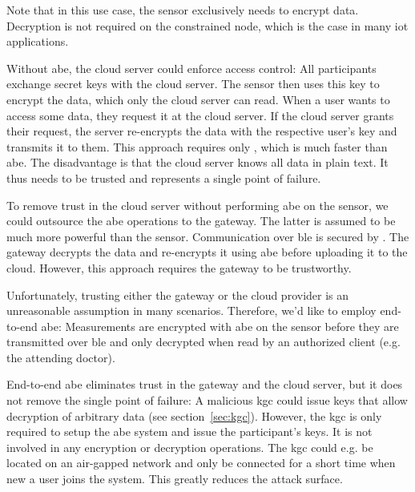 Note that in this use case, the sensor exclusively needs to encrypt data.
Decryption is not required on the constrained node, which is the case in many \acrshort{iot} applications.

Without \acrshort{abe}, the cloud server could enforce access control:
All participants exchange secret keys with the cloud server.
The sensor then uses this key to encrypt the data, which only the cloud server can read.
When a user wants to access some data, they request it at the cloud server.
If the cloud server grants their request, the server re-encrypts the data with the respective user's key and transmits it to them.
This approach requires only , which is much faster than \acrshort{abe}.
The disadvantage is that the cloud server knows all data in plain text. It thus needs to be trusted and represents a single point of failure.

To remove trust in the cloud server without performing \acrshort{abe} on the sensor, we could outsource the \acrshort*{abe} operations to the gateway.
The latter is assumed to be much more powerful than the sensor.
Communication over \acrshort{ble} is secured by .
The gateway decrypts the data and re-encrypts it using \acrshort{abe} before uploading it to the cloud.
However, this approach requires the gateway to be trustworthy.

Unfortunately, trusting either the gateway or the cloud provider is an unreasonable assumption in many scenarios.
Therefore, we'd like to employ end-to-end \acrlong{abe}:
Measurements are encrypted with \acrshort{abe} on the sensor before they are transmitted over \acrshort{ble} and only decrypted when read by an authorized client (e.g. the attending doctor).

End-to-end \acrshort{abe} eliminates trust in the gateway and the cloud server, but it does not remove the single point of failure:
A malicious \acrfull{kgc} could issue keys that allow decryption of arbitrary data (see section~\ref{sec:kgc}).
However, the \acrshort{kgc} is only required to setup the \acrshort{abe} system and issue the participant's keys.
It is not involved in any encryption or decryption operations.
The \acrshort{kgc} could e.g. be located on an air-gapped network and only be connected for a short time when new a user joins the system. 
This greatly reduces the attack surface.


